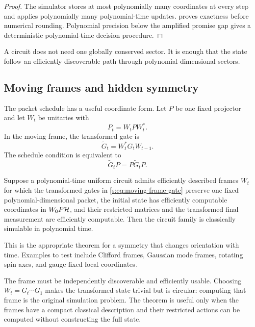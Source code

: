 \begin{proof}
The simulator stores at most polynomially many coordinates at every step and applies polynomially many polynomial-time updates.  proves exactness before numerical rounding. Polynomial precision below the amplified promise gap gives a deterministic polynomial-time decision procedure.
\end{proof}

\begin{derivedbox}
A circuit does not need one globally conserved sector. It is enough that the state follow an efficiently discoverable path through polynomial-dimensional sectors.
\end{derivedbox}

\subsection{Moving frames and hidden symmetry}
The packet schedule has a useful coordinate form. Let $P$ be one fixed projector and let $W_t$ be unitaries with
\[
P_t=W_tPW_t^*.
\]
In the moving frame, the transformed gate is
\begin{equation}
\widetilde G_t
=W_t^*G_tW_{t-1}.
\label{s:eq:moving-frame-gate}
\end{equation}
The schedule condition is equivalent to
\[
\widetilde G_tP=P\widetilde G_tP.
\]

\begin{corollary}
\label{s:cor:moving-frame-collapse}
Suppose a polynomial-time uniform circuit admits efficiently described frames $W_t$ for which the transformed gates in \cref{s:eq:moving-frame-gate} preserve one fixed polynomial-dimensional packet, the initial state has efficiently computable coordinates in $W_0P\mathcal H$, and their restricted matrices and the transformed final measurement are efficiently computable. Then the circuit family is classically simulable in polynomial time.
\end{corollary}

This is the appropriate theorem for a symmetry that changes orientation with time. Examples to test include Clifford frames, Gaussian mode frames, rotating spin axes, and gauge-fixed local coordinates.

\begin{scopebox}
The frame must be independently discoverable and efficiently usable. Choosing $W_t=G_t\cdots G_1$ makes the transformed state trivial but is circular: computing that frame is the original simulation problem. The theorem is useful only when the frames have a compact classical description and their restricted actions can be computed without constructing the full state.
\end{scopebox}


